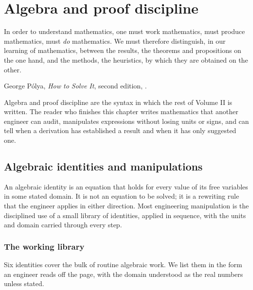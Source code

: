 \chapter{Algebra and proof discipline}
\label{vol02:ch01}

\epigraph{In order to understand mathematics, one must work
mathematics, must produce mathematics, must \emph{do} mathematics. We
must therefore distinguish, in our learning of mathematics, between the
results, the theorems and propositions on the one hand, and the
methods, the heuristics, by which they are obtained on the other.}{
George P\'{o}lya, \emph{How to Solve It}, second edition,
\cite[p.~vi]{gen:polya1945}.}


\noindent
Algebra and proof discipline are the syntax in which the rest of
Volume II is written. The reader who finishes this chapter writes
mathematics that another engineer can audit, manipulates expressions
without losing units or signs, and can tell when a derivation has
established a result and when it has only suggested one.

\section{Algebraic identities and manipulations}

An algebraic identity is an equation that holds for every value of its
free variables in some stated domain. It is not an equation to be
solved; it is a rewriting rule that the engineer applies in either
direction. Most engineering manipulation is the disciplined use of a
small library of identities, applied in sequence, with the units and
domain carried through every step.

\subsection{The working library}

Six identities cover the bulk of routine algebraic work. We list them
in the form an engineer reads off the page, with the domain
understood as the real numbers unless stated.

